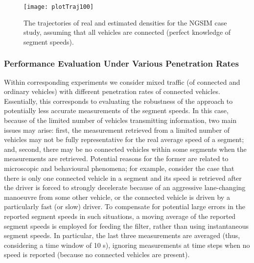 \documentclass[titlepage,oneside,fleqn,12pt]{article}
\begin{document}
\begin{figure}
\begin{center}
	\texttt{[image: plotTraj100]}
	\caption{The trajectories of real and estimated densities for the NGSIM case study, assuming that all vehicles are connected (perfect knowledge of segment speeds).} 
	\label{fig:traj100}
\end{center}
\end{figure}

\subsubsection{Performance Evaluation Under Various Penetration Rates}

Within corresponding experiments we consider mixed traffic (of connected and ordinary vehicles) with different penetration rates of connected vehicles. Essentially, this corresponds to evaluating the robustness of the approach to potentially less accurate measurements of the segment speeds. In this case, because of the limited number of vehicles transmitting information, two main issues may arise: first, the measurement retrieved from a limited number of vehicles may not be fully representative for the real average speed of a segment; and, second, there may be no connected vehicles within some segments when the measurements are retrieved. Potential reasons for the former are related to microscopic and behavioural phenomena; for example, consider the case that there is only one connected vehicle in a segment and its speed is retrieved after the driver is forced to strongly decelerate because of an aggressive lane-changing manoeuvre from some other vehicle, or the connected vehicle is driven by a particularly fast (or slow) driver. To compensate for potential large errors in the reported segment speeds in such situations, a moving average of the reported segment speeds is employed for feeding the filter, rather than using instantaneous segment speeds. In particular, the last three measurements are averaged (thus, considering a time window of 10 s), ignoring measurements at time steps when no speed is reported (because no connected vehicles are present).
\end{document}
